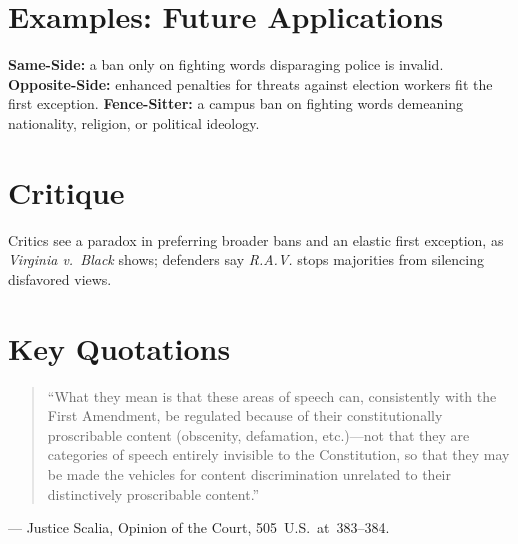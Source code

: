 \documentclass[12pt]{article}
\begin{document}
\section{Examples: Future Applications}
\textbf{Same-Side:} a ban only on fighting words disparaging police is invalid. \textbf{Opposite-Side:} enhanced penalties for threats against election workers fit the first exception. \textbf{Fence-Sitter:} a campus ban on fighting words demeaning nationality, religion, or political ideology.

\section{Critique}
Critics see a paradox in preferring broader bans and an elastic first exception, as \textit{Virginia v.\ Black} shows; defenders say \textit{R.A.V.} stops majorities from silencing disfavored views.

\section{Key Quotations}
\begin{quote}
``What they mean is that these areas of speech can, consistently with the First Amendment, be regulated because of their constitutionally proscribable content (obscenity, defamation, etc.)---not that they are categories of speech entirely invisible to the Constitution, so that they may be made the vehicles for content discrimination unrelated to their distinctively proscribable content.''
\end{quote}
\noindent --- Justice Scalia, Opinion of the Court, 505~U.S.~at~383--384.
\end{document}
